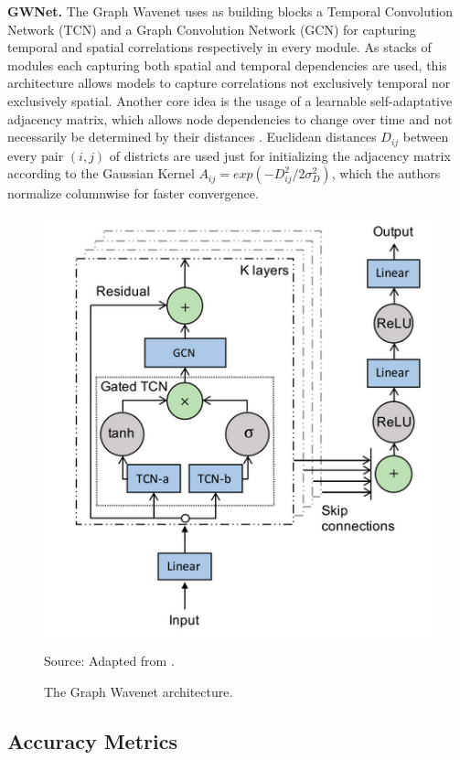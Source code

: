 \noindent
\textbf{GWNet.} The Graph Wavenet uses as building blocks a Temporal Convolution Network (TCN) and a Graph Convolution Network (GCN) for capturing temporal and spatial correlations respectively in every module.
As stacks of modules each capturing both spatial and temporal dependencies are used, this architecture allows models to capture correlations not exclusively temporal nor exclusively spatial.
Another core idea is the usage of a learnable self-adaptative adjacency matrix, which allows node dependencies to change over time and not necessarily be determined by their distances \cite{wu2019graphwavenet, liu2020intro}.
Euclidean distances $D_{ij}$ between every pair $(i,j)$ of districts are used just for initializing the adjacency matrix according to the Gaussian Kernel $A_{ij} = exp(-D_{ij}^2/2\sigma_{D}^2)$, which the authors normalize columnwise for faster convergence.
\begin{figure}[H]
   \centering
    \caption{The Graph Wavenet architecture.}
    \includegraphics[scale=0.5]{graphwavenet.png}  \\
    \raggedright
    Source: Adapted from \cite{wu2019graphwavenet}.
   \label{fig:graphwavenet}
\end{figure}

\subsection{Accuracy Metrics}

